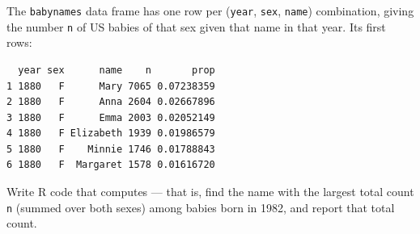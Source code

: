 \question[8]{}

The \verb|babynames| data frame has one row per (\verb|year|, \verb|sex|, \verb|name|) combination, giving the number \verb|n| of US babies of that sex given that name in that year. Its first rows:

\begin{verbatim}
  year sex      name    n       prop
1 1880   F      Mary 7065 0.07238359
2 1880   F      Anna 2604 0.02667896
3 1880   F      Emma 2003 0.02052149
4 1880   F Elizabeth 1939 0.01986579
5 1880   F    Minnie 1746 0.01788843
6 1880   F  Margaret 1578 0.01616720
\end{verbatim}

Write R code that computes  --- that is, find the name with the largest total count \verb|n| (summed over both sexes) among babies born in 1982, and report that total count.

\ifanswerspace
\vfillstretch
\fi
